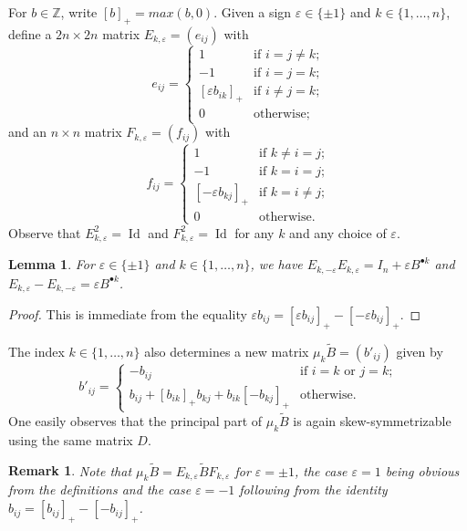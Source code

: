 \documentclass{amsart}
\newtheorem{lemma}[theorem]{Lemma}
\newtheorem{remark}[theorem]{Remark}
\numberwithin{theorem}{section}
\newcommand{\ZZ}{\mathbb{Z}}
\newcommand{\Id}{\operatorname{Id}}
\begin{document}
  For $b\in\ZZ$, write $[b]_+=max(b,0)$.
  Given a sign $\varepsilon\in\{\pm1\}$ and $k\in\{1,\ldots,n\}$, define a $2n\times 2n$ matrix $E_{k,\varepsilon}=(e_{ij})$ with
  \begin{equation}
    \label{eq:left mutation matrix}
    e_{ij}=\begin{cases} 1 & \text{if $i=j\ne k$;}\\ -1 & \text{if $i=j=k$;}\\ [\varepsilon b_{ik}]_+ & \text{if $i\ne j=k$;}\\ 0 & \text{otherwise;} \end{cases}
  \end{equation}
  and an $n\times n$ matrix $F_{k,\varepsilon}=(f_{ij})$ with
  \begin{equation}
    \label{eq:right mutation matrix}
    f_{ij}=\begin{cases} 1 & \text{if $k\ne i=j$;}\\ -1 & \text{if $k=i=j$;}\\ [-\varepsilon b_{kj}]_+ & \text{if $k=i\ne j$;}\\ 0 & \text{otherwise.} \end{cases}
  \end{equation}
  Observe that $E^2_{k,\varepsilon}=\Id$ and $F^2_{k,\varepsilon}=\Id$ for any $k$ and any choice of $\varepsilon$.
  \begin{lemma}
    For $\varepsilon\in\{\pm1\}$ and $k\in\{1,\ldots,n\}$, we have $E_{k,-\varepsilon}E_{k,\varepsilon}=I_n+\varepsilon B^{\bullet k}$ and $E_{k,\varepsilon}-E_{k,-\varepsilon}=\varepsilon B^{\bullet k}$.
  \end{lemma}
  \begin{proof}
    This is immediate from the equality $\varepsilon b_{ij}=[\varepsilon b_{ij}]_+-[-\varepsilon b_{ij}]_+$.
  \end{proof}

  The index $k\in\{1,\ldots,n\}$ also determines a new matrix $\mu_k \tilde{B}=(b'_{ij})$ given by
  \begin{equation}
    \label{eq:matrix mutation}
    b'_{ij}=\begin{cases} -b_{ij} & \text{if $i=k$ or $j=k$;}\\ b_{ij}+[b_{ik}]_+b_{kj}+b_{ik}[-b_{kj}]_+ & \text{otherwise.} \end{cases}
  \end{equation}
    One easily observes that the principal part of $\mu_k \tilde{B}$ is again skew-symmetrizable using the same matrix $D$.
  \begin{remark}
    Note that $\mu_k \tilde{B}=E_{k,\varepsilon} \tilde{B} F_{k,\varepsilon}$ for $\varepsilon=\pm 1$, the case $\varepsilon=1$ being obvious from the definitions and the case $\varepsilon=-1$ following from the identity $b_{ij}=[b_{ij}]_+-[-b_{ij}]_+$.
  \end{remark}
\end{document}
